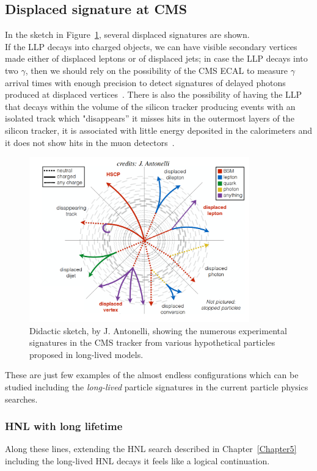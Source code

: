 \subsection{Displaced signature at CMS}
In the sketch in Figure~\ref{fig:c6antonelli}, several displaced
signatures are shown.\\
If the LLP decays into charged objects, we can have visible secondary vertices
made either of displaced leptons or of displaced jets; in case the LLP decays into two $\gamma$,
then we should rely on the possibility of the CMS
ECAL to measure $\gamma$ arrival times with enough precision to detect
signatures of delayed photons produced at displaced
vertices~\cite{Sirunyan:2019wau}.
There is also the possibility of having the LLP that decays within the
volume of the silicon tracker producing events with an isolated track
which "disappears'' \ie it misses hits in the outermost layers of the
silicon tracker, it is associated with little energy deposited in the
calorimeters and it does not show hits in the muon detectors~\cite{Sirunyan_2020disapp}. 
\begin{figure}[h]
\centering
\includegraphics[clip,trim=0cm 0.cm 0.cm 1.6cm, width=0.85\textwidth]{Figures/c6/antonelli_skech.pdf}
\caption{Didactic sketch, by J. Antonelli, showing the numerous
  experimental signatures in the CMS tracker from various hypothetical particles proposed in long-lived models. }
\label{fig:c6antonelli}
\end{figure}

These are just few examples of the almost endless configurations which can
be studied including the \emph{long-lived} particle signatures in the
current particle physics searches. 

\subsubsection{HNL with long lifetime}
Along these lines, extending the HNL search described in
Chapter~\ref{Chapter5} including the long-lived HNL decays it feels like a logical
continuation. 

